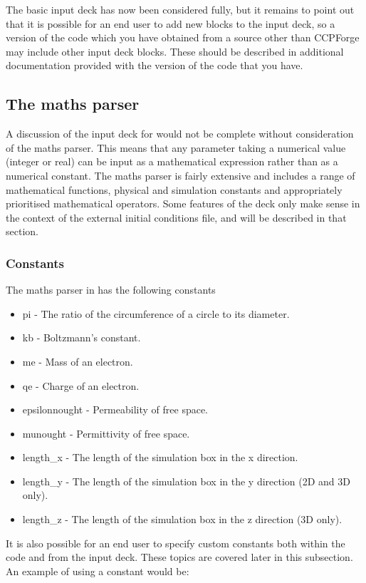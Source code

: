 \documentclass[12pt,a4paper]{article}
\newcommand{\inlinecode}[1]{{\color{warwickred} \bf\texttt{#1}}}
\newcommand{\EPOCH}{{\color{warwickdark}\fontfamily{phv}\selectfont{EPOCH}}}
\begin{document}
The basic input deck has now been considered fully, but it remains to point
out that it is possible for an end user to add new blocks to the input deck,
so a version of the code which you have obtained from a source other than
CCPForge may include other input deck blocks. These should be described in
additional documentation provided with the version of the code that you have.

\subsection{The maths parser}
A discussion of the input deck for {\EPOCH} would not be complete without
consideration of the maths parser. This means that any parameter taking a
numerical value (integer or real) can be input as a mathematical expression
rather than as a numerical constant. The maths parser is fairly extensive and
includes a range of mathematical functions, physical and simulation constants
and appropriately prioritised mathematical operators. Some features of the
deck only make sense in the context of the external initial conditions file,
and will be described in that section.

\subsubsection{Constants}
The maths parser in {\EPOCH}  has the following constants
\begin{itemize}
\item pi - The ratio of the circumference of a circle to its diameter.
\item kb - Boltzmann's constant.
\item me - Mass of an electron.
\item qe - Charge of an electron.
\item epsilonnought - Permeability of free space.
\item munought - Permittivity of free space.
\item length\_x - The length of the simulation box in the x direction.
\item length\_y - The length of the simulation box in the y direction (2D and 3D
  only).
\item length\_z - The length of the simulation box in the z direction (3D only).
\end{itemize}

It is also possible for an end user to specify custom constants both within
the code and from the input deck. These topics are covered later in this
subsection. An example of using a constant would be:\\
\indent\inlinecode{length\_x = pi}\\
\end{document}
